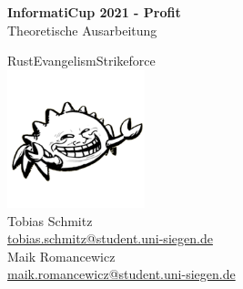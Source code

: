 \documentclass[12pt,a4paper]{article}
\newcommand{\HRule}{\rule{\linewidth}{0.5mm}}
\begin{document}
\begin{titlepage}
\begin{center}


\vspace*{2cm}
{ \LARGE 
  \textbf{InformatiCup 2021 - Profit}\\[0.4cm]
  Theoretische Ausarbeitung\\
}
\vspace*{2cm}

{ \large
  RustEvangelismStrikeforce\\
    \vspace*{1cm}
    \includegraphics[width=0.3\textwidth]{logo.png}\\
  Tobias Schmitz \\ \href{tobias.schmitz@student.uni-siegen.de}{tobias.schmitz@student.uni-siegen.de} \\
  Maik Romancewicz \\ \href{tobias.schmitz@student.uni-siegen.de}{maik.romancewicz@student.uni-siegen.de} \\
}
\vfill



 
\end{center}
\end{titlepage}

\newpage

\tableofcontents
\thispagestyle{empty}
\newpage

\thispagestyle{empty}
\newpage

\setcounter{page}{1}
\end{document}
